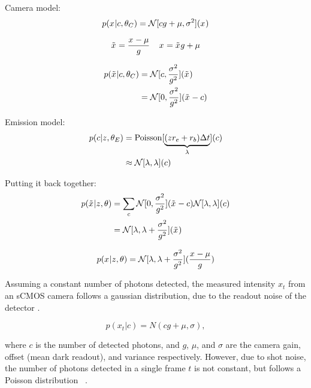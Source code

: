 Camera model:
\begin{equation}
  p(x_{}|c,\theta_C) = \mathcal{N}[cg + \mu, \sigma^2](x_{})
\end{equation}

\begin{equation}
  \tilde{x}_{} = \frac{x_{} - \mu}{g}
  \;\;\;\;
  x_{} = \tilde{x}_{}g + \mu
\end{equation}

\begin{align}
  p(\tilde{x}_{}|c,\theta_C)
    &= \mathcal{N}[c, \frac{\sigma^2}{g^2}](\tilde{x}_{}) \\
    &= \mathcal{N}[0, \frac{\sigma^2}{g^2}](\tilde{x}_{} - c)
\end{align}


Emission model:
\begin{align}
  p(c|z_{},\theta_E)
    &= \operatorname{Poisson}[\underbrace{(z_{}r_e + r_b)\Delta t}_{\lambda}](c) \\
    &\approx \mathcal{N}[\lambda, \lambda](c)
\end{align}

Putting it back together:
\begin{align}
  p(\tilde{x}_{}|z_{},\theta)
    &= \sum_c
      \mathcal{N}[0, \frac{\sigma^2}{g^2}](\tilde{x}_{} - c)
      \mathcal{N}[\lambda, \lambda](c) \\
    &= \mathcal{N}[\lambda, \lambda + \frac{\sigma^2}{g^2}](\tilde{x}_{})
\end{align}

\begin{equation}
  p(x_{}|z_{},\theta) =
    \mathcal{N}[\lambda, \lambda + \frac{\sigma^2}{g^2}](\frac{x_{}-\mu}{g})
\end{equation}


Assuming a constant number of photons detected, the measured intensity $x_{t}$ from an sCMOS
  camera follows a gaussian distribution, due to the readout noise of the detector .

  \begin{equation}
    p(x_{t}|c) = N(cg + \mu, \sigma),
    \label{eq:read_out}
  \end{equation}

  where $c$ is the number of detected photons, and $g$, $\mu$, and $\sigma$ are the
  camera gain, offset (mean dark readout), and variance respectively.
  However, due to shot noise, the number of photons detected in a single frame $t$ is not constant, 
  but follows a Poisson distribution~\cite{mehta_poisson_2016} .

